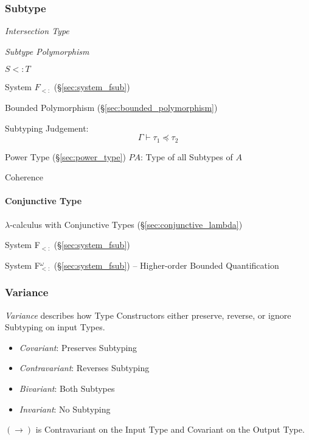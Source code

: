 
\subsubsection{Subtype}\label{sec:subtype}

\emph{Intersection Type}

\emph{Subtype Polymorphism}

$S <: T$

System $F_{<:}$ (\S\ref{sec:system_fsub})

Bounded Polymorphism (\S\ref{sec:bounded_polymorphism})

Subtyping Judgement:
\[
  \Gamma \vdash \tau_1 \preceq \tau_2
\]

Power Type (\S\ref{sec:power_type}) $P A$: Type of all Subtypes of $A$

Coherence



\paragraph{Conjunctive Type}\label{sec:conjunctive_type}\hfill

$\lambda$-calculus with Conjunctive Types
(\S\ref{sec:conjunctive_lambda})

System F$_{<:}$ (\S\ref{sec:system_fsub})

System F$_{<:}^\omega$ (\S\ref{sec:system_fsub}) -- Higher-order
Bounded Quantification



\subsubsection{Variance}\label{sec:type_variance}

\emph{Variance} describes how Type Constructors either preserve,
reverse, or ignore Subtyping on input Types.

\begin{itemize}
  \item \emph{Covariant}: Preserves Subtyping
  \item \emph{Contravariant}: Reverses Subtyping
  \item \emph{Bivariant}: Both Subtypes
  \item \emph{Invariant}: No Subtyping
\end{itemize}

$(\rightarrow)$ is Contravariant on the Input Type and Covariant on
the Output Type.



